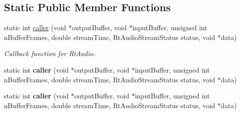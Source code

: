 \subsection*{Static Public Member Functions}
\begin{DoxyCompactItemize}
\item 
\hypertarget{classdispatch_a78e0b45ddb573d1b843ce02cd9092557}{static int \hyperlink{classdispatch_a78e0b45ddb573d1b843ce02cd9092557}{caller} (void $\ast$output\-Buffer, void $\ast$input\-Buffer, unsigned int n\-Buffer\-Frames, double stream\-Time, Rt\-Audio\-Stream\-Status status, void $\ast$data)}\label{classdispatch_a78e0b45ddb573d1b843ce02cd9092557}

\begin{DoxyCompactList}\small\item\em Callback function for Rt\-Audio. \end{DoxyCompactList}\item 
\hypertarget{classdispatch_a2bc93711c1aee895c430aece41ec026a}{static int {\bfseries caller} (void $\ast$output\-Buffer, void $\ast$input\-Buffer, unsigned int n\-Buffer\-Frames, double stream\-Time, Rt\-Audio\-Stream\-Status status, void $\ast$data)}\label{classdispatch_a2bc93711c1aee895c430aece41ec026a}

\item 
\hypertarget{classdispatch_a2bc93711c1aee895c430aece41ec026a}{static int {\bfseries caller} (void $\ast$output\-Buffer, void $\ast$input\-Buffer, unsigned int n\-Buffer\-Frames, double stream\-Time, Rt\-Audio\-Stream\-Status status, void $\ast$data)}\label{classdispatch_a2bc93711c1aee895c430aece41ec026a}

\end{DoxyCompactItemize}
